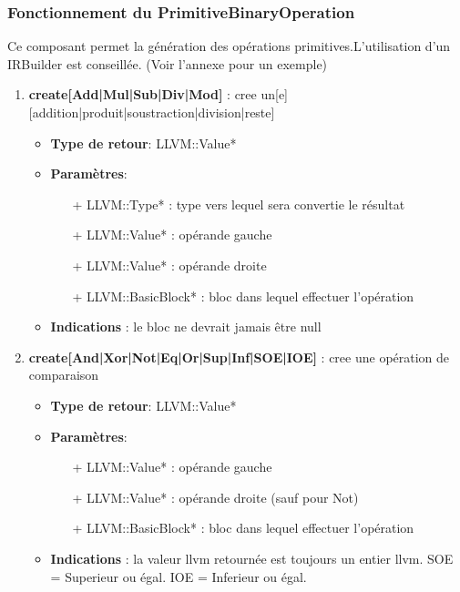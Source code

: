 \documentclass{article}
\begin{document}
   \subsubsection{Fonctionnement du PrimitiveBinaryOperation}
   Ce composant permet la génération des opérations primitives.L'utilisation d'un IRBuilder est conseillée. \small{(Voir l'annexe pour un exemple)}

   \begin{enumerate} 
    \item \textbf{create[Add|Mul|Sub|Div|Mod]} : cree un[e] [addition|produit|soustraction|division|reste] 
    \begin{itemize}
     \item \textbf{Type de retour}: LLVM::Value*
     \item \textbf{Paramètres}:
     \begin{enumerate}
       \item[+] LLVM::Type*  : type vers lequel sera convertie le résultat
       \item[+] LLVM::Value* : opérande gauche
       \item[+] LLVM::Value* : opérande droite 
       \item[+] LLVM::BasicBlock* : bloc dans lequel effectuer l'opération
     \end{enumerate}
     \item \textbf{Indications} : le bloc ne devrait jamais être null
     \end{itemize}

    \item \textbf{create[And|Xor|Not|Eq|Or|Sup|Inf|SOE|IOE]} : cree une opération de comparaison
    \begin{itemize}
     \item \textbf{Type de retour}: LLVM::Value*
     \item \textbf{Paramètres}:
     \begin{enumerate}
       \item[+] LLVM::Value* : opérande gauche
       \item[+] LLVM::Value* : opérande droite (sauf pour Not)
       \item[+] LLVM::BasicBlock* : bloc dans lequel effectuer l'opération
     \end{enumerate}
     \item \textbf{Indications} : la valeur llvm retournée est toujours un entier llvm. SOE = Superieur ou égal. IOE = Inferieur ou égal.
     \end{itemize}


\end{enumerate}
\end{document}
